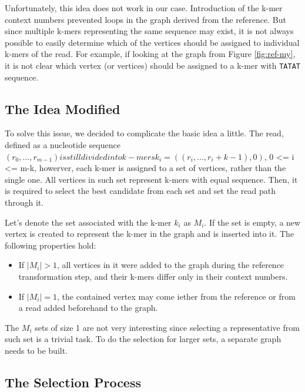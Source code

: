 Unfortunately, this idea does not work in our case. Introduction of the k-mer context numbers prevented loops in the graph derived from the reference. But since multiple k-mers representing the same sequence may exist, it is not always possible to easily determine which of the vertices should be assigned to individual k-mers of the read. For example, if looking at the graph from Figure \ref{fig:ref-my}, it is not clear which vertex (or vertices) should be assigned to a k-mer with \texttt{TATAT} sequence. 

\subsection{The Idea Modified}

To solve this issue, we decided to complicate the basic idea a little. The read, defined as a nucleotide sequence $(r_0, ..., r_{m-1}) is still divided into k-mers k_{i} = ((r_i, ..., r_i+k-1), 0)$, 0 <= i <= m-k, howerver, each k-mer is assigned to a set of vertices, rather than the single one. All vertices in such set represent k-mers with equal sequence. Then, it is required to select the best candidate from each set and set the read path through it.

Let's denote the set associated with the k-mer $k_{i}$ as $M_{i}$. If the set is empty, a new vertex is created to represent the k-mer in the graph and is inserted into it. The following properties hold:
\begin{itemize}
\item If $|M_{i}| > 1$, all vertices in it were added to the graph during the reference transformation step, and their k-mers differ only in their context numbers.
\item If $|M_{i}| = 1$, the contained vertex may come iether from the reference or from a read added beforehand to the graph.
\end{itemize}

The $M_i$ sets of size 1 are not very interesting since selecting a representative from such set is a trivial task. To do the selection for larger sets, a separate graph needs to be built.

\subsection{The Selection Process}

